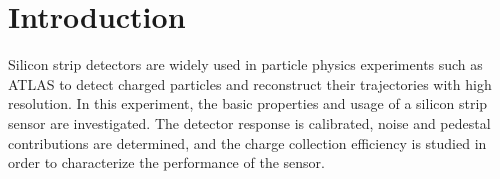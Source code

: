 \section{Introduction}
\label{sec:intro}
Silicon strip detectors are widely used in particle physics experiments such as ATLAS to detect charged particles and reconstruct their trajectories with high resolution. In this experiment, the basic properties and usage of a silicon strip sensor are investigated. The detector response is calibrated, noise and pedestal contributions are determined, and the charge collection efficiency is studied in order to characterize the performance of the sensor.